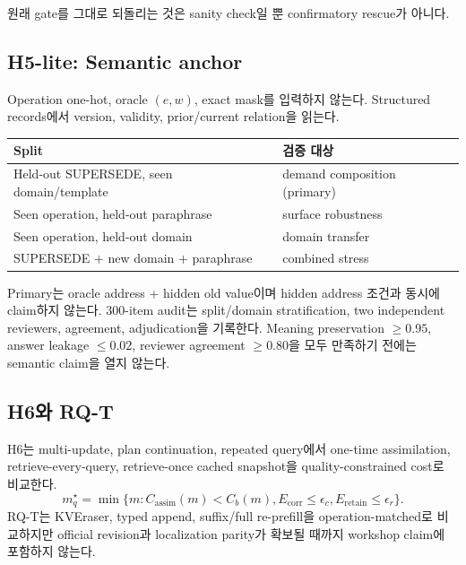 \documentclass[10.5pt,a4paper]{article}
\begin{document}
원래 gate를 그대로 되돌리는 것은 sanity check일 뿐 confirmatory rescue가 아니다.

\subsection{H5-lite: Semantic anchor}
Operation one-hot, oracle $(e,w)$, exact mask를 입력하지 않는다. Structured records에서 version, validity, prior/current relation을 읽는다.

\begin{center}
\begin{tabular}{ll}
\toprule
Split & 검증 대상 \\
\midrule
Held-out SUPERSEDE, seen domain/template & demand composition (primary) \\
Seen operation, held-out paraphrase & surface robustness \\
Seen operation, held-out domain & domain transfer \\
SUPERSEDE + new domain + paraphrase & combined stress \\
\bottomrule
\end{tabular}
\end{center}

Primary는 oracle address + hidden old value이며 hidden address 조건과 동시에 claim하지 않는다. 300-item audit는 split/domain stratification, two independent reviewers, agreement, adjudication을 기록한다. Meaning preservation $\ge0.95$, answer leakage $\le0.02$, reviewer agreement $\ge0.80$을 모두 만족하기 전에는 semantic claim을 열지 않는다.

\subsection{H6와 RQ-T}
H6는 multi-update, plan continuation, repeated query에서 one-time assimilation, retrieve-every-query, retrieve-once cached snapshot을 quality-constrained cost로 비교한다.
\[
m_q^\star=
\min\{m:C_{\mathrm{assim}}(m)<C_b(m),
E_{\mathrm{corr}}\le\epsilon_c,
E_{\mathrm{retain}}\le\epsilon_r\}.
\]
RQ-T는 KVEraser\citep{kveraser2026}, typed append, suffix/full re-prefill을 operation-matched로 비교하지만 official revision과 localization parity가 확보될 때까지 workshop claim에 포함하지 않는다.
\end{document}
